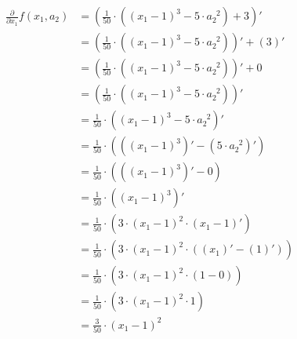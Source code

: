 \documentclass{article}
\begin{document}
            \begin{align*}
              \frac{\partial}{\partial x_1} f(x_1, a_2)
                & = \left(
                      \frac{1}{50}
                      \cdot
                      \left( (x_1 - 1)^3 - 5 \cdot a_2^{\enspace 2} \right)
                      +
                      3
                    \right)' \\
                & = \left(
                      \frac{1}{50}
                      \cdot
                      \left( (x_1 - 1)^3 - 5 \cdot a_2^{\enspace 2} \right)
                    \right)'
                    +
                    (3)' \\
                & = \left(
                      \frac{1}{50}
                      \cdot
                      \left( (x_1 - 1)^3 - 5 \cdot a_2^{\enspace 2} \right)
                    \right)'
                    +
                    0 \\
                & = \left(
                      \frac{1}{50}
                      \cdot
                      \left( (x_1 - 1)^3 - 5 \cdot a_2^{\enspace 2} \right)
                    \right)' \\
                & = \frac{1}{50}
                    \cdot
                    \left( (x_1 - 1)^3 - 5 \cdot a_2^{\enspace 2} \right)' \\
                & = \frac{1}{50}
                    \cdot
                    \left(
                      \left(
                        (x_1 - 1)^3 \right)' - \left(5 \cdot a_2^{\enspace 2}
                      \right)'
                    \right) \\
                & = \frac{1}{50}
                    \cdot
                    \left( \left( (x_1 - 1)^3 \right)' - 0 \right) \\
                & = \frac{1}{50}
                    \cdot
                    \left( (x_1 - 1)^3 \right)' \\
                & = \frac{1}{50}
                    \cdot
                    \left(
                      3 \cdot (x_1 - 1)^2 \cdot \left( x_1 - 1 \right)'
                    \right) \\
                & = \frac{1}{50}
                    \cdot
                    \left(
                      3 \cdot (x_1 - 1)^2 \cdot \left( (x_1)' - (1)' \right)
                    \right) \\
                & = \frac{1}{50}
                    \cdot
                    \left( 3 \cdot (x_1 - 1)^2 \cdot (1 - 0) \right) \\
                & = \frac{1}{50}
                    \cdot
                    \left( 3 \cdot (x_1 - 1)^2 \cdot 1 \right) \\
                & = \frac{3}{50} \cdot (x_1 - 1)^2 \\
            \end{align*}
\end{document}
